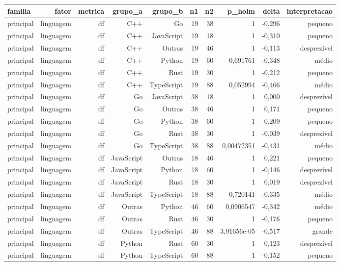 \begin{tabular}{lrrrrrrrrr}
\hline
familia & fator & metrica & grupo\_a & grupo\_b & n1 & n2 & p\_holm & delta & interpretacao \\
\hline
principal & linguagem & df & C++ & Go & 19 & 38 & 1 & -0,296 & pequeno \\
principal & linguagem & df & C++ & JavaScript & 19 & 18 & 1 & -0,310 & pequeno \\
principal & linguagem & df & C++ & Outras & 19 & 46 & 1 & -0,113 & desprezível \\
principal & linguagem & df & C++ & Python & 19 & 60 & 0,691761 & -0,348 & médio \\
principal & linguagem & df & C++ & Rust & 19 & 30 & 1 & -0,212 & pequeno \\
principal & linguagem & df & C++ & TypeScript & 19 & 88 & 0,052994 & -0,466 & médio \\
principal & linguagem & df & Go & JavaScript & 38 & 18 & 1 & 0,000 & desprezível \\
principal & linguagem & df & Go & Outras & 38 & 46 & 1 & 0,171 & pequeno \\
principal & linguagem & df & Go & Python & 38 & 60 & 1 & -0,209 & pequeno \\
principal & linguagem & df & Go & Rust & 38 & 30 & 1 & -0,039 & desprezível \\
principal & linguagem & df & Go & TypeScript & 38 & 88 & 0,00472351 & -0,431 & médio \\
principal & linguagem & df & JavaScript & Outras & 18 & 46 & 1 & 0,221 & pequeno \\
principal & linguagem & df & JavaScript & Python & 18 & 60 & 1 & -0,146 & desprezível \\
principal & linguagem & df & JavaScript & Rust & 18 & 30 & 1 & 0,019 & desprezível \\
principal & linguagem & df & JavaScript & TypeScript & 18 & 88 & 0,720141 & -0,335 & médio \\
principal & linguagem & df & Outras & Python & 46 & 60 & 0,0906547 & -0,342 & médio \\
principal & linguagem & df & Outras & Rust & 46 & 30 & 1 & -0,176 & pequeno \\
principal & linguagem & df & Outras & TypeScript & 46 & 88 & 3,91656e-05 & -0,517 & grande \\
principal & linguagem & df & Python & Rust & 60 & 30 & 1 & 0,123 & desprezível \\
principal & linguagem & df & Python & TypeScript & 60 & 88 & 1 & -0,152 & pequeno \\

\end{tabular}
